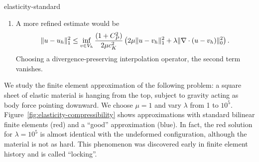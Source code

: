 \begin{Problem}{elasticity-standard}
\begin{solution}
\begin{enumerate}
   \item A more refined estimate would be
   \begin{align*}
    \lVert u-u_h\rVert_1^2\leq \inf_{v\in V_h}\frac{(1+C_P^2)}{2\mu c_K^2}\left(2\mu\lVert u-v_h\rVert_1^2+\lambda \lVert\nabla\cdot (u-v_h)\rVert_0^2\right).
   \end{align*}
   Choosing a divergence-preserving interpolation operator, the second term vanishes.
  \end{enumerate}
\end{solution}
\end{Problem}

\begin{example}
  We study the finite element approximation of the following problem:
  a square sheet of elastic material is hanging from the top, subject
  to gravity acting as body force pointing downward. We choose $\mu=1$
  and vary $\lambda$ from 1 to
  $10^5$. Figure~\ref{fig:elasticity-compressibility} shows
  approximations with standard bilinear finite elements (red) and a
  ``good'' approximation (blue). In fact, the red solution for
  $\lambda = 10^5$ is almost identical with the undeformed
  configuration, although the material is not as hard. This phenomenon
  was discovered early in finite element history and is called
  ``locking''.
\end{example}
